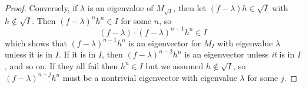 \documentclass{amsart}
\begin{document}
\begin{proof}
		Conversely, if $\lambda$ is an eigenvalue of $M_{\sqrt{I}}$, then let $(f-\lambda)h\in \sqrt{I}$ with $h\not\in \sqrt{I}$. Then $(f-\lambda)^nh^n\in I$ for some $n$, so 
		$$
		(f-\lambda) \cdot (f-\lambda)^{n-1}h^n \in I
		$$
		which shows that $(f-\lambda)^{n-1}h^n$ is an eigenvector for $M_I$ with eigenvalue $\lambda$ unless it is in $I$. If it is in $I$, then $(f-\lambda)^{n-2}h^n$ is an eigenvector unless \textit{it} is in $I$, and so on. If they all fail then $h^n\in I$ but we assumed $h\not\in \sqrt{I}$, so $(f-\lambda)^{n-j}h^n$ must be a nontrivial eigenvector with eigenvalue $\lambda$ for some $j$.
	\end{proof}
	
	
\end{document}
